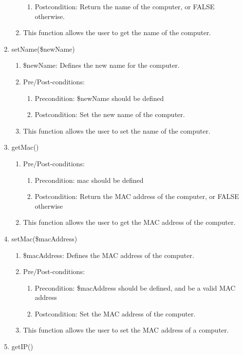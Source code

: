 \documentclass{article}
\begin{document}
\begin{enumerate}
\begin{enumerate}
\begin{enumerate}
\item Postcondition: Return the name of the computer, or FALSE otherwise.
\end{enumerate}
\item This function allows the user to get the name of the computer.
\end{enumerate}
\item setName(\$newName)
\begin{enumerate}
\item \$newName: Defines the new name for the computer.
\item Pre/Post-conditions:
\begin{enumerate}
\item Precondition: \$newName should be defined
\item Postcondition: Set the new name of the computer.
\end{enumerate}
\item This function allows the user to set the name of the computer.
\end{enumerate}
\item getMac()
\begin{enumerate}
\item Pre/Post-conditions:
\begin{enumerate}
\item Precondition: mac should be defined
\item Postcondition: Return the MAC address of the computer, or FALSE otherwise
\end{enumerate}
\item This function allows the user to get the MAC address of the computer.
\end{enumerate}
\item setMac(\$macAddress)
\begin{enumerate}
\item \$macAddress: Defines the MAC address of the computer.
\item Pre/Post-conditions:
\begin{enumerate}
\item Precondition: \$macAddress should be defined, and be a valid MAC address
\item Postcondition: Set the MAC address of the computer.
\end{enumerate}
\item This function allows the user to set the MAC address of a computer.
\end{enumerate}
\item getIP()
\begin{enumerate}

\end{enumerate}
\end{enumerate}
\end{document}
